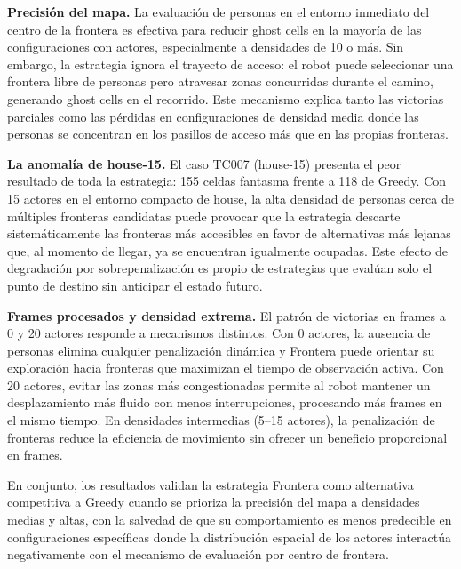 \textbf{Precisión del mapa.} La evaluación de personas en el entorno inmediato del centro de la frontera es efectiva para reducir ghost cells en la mayoría de las configuraciones con actores, especialmente a densidades de 10 o más. Sin embargo, la estrategia ignora el trayecto de acceso: el robot puede seleccionar una frontera libre de personas pero atravesar zonas concurridas durante el camino, generando ghost cells en el recorrido. Este mecanismo explica tanto las victorias parciales como las pérdidas en configuraciones de densidad media donde las personas se concentran en los pasillos de acceso más que en las propias fronteras.

\textbf{La anomalía de house-15.} El caso TC007 (house-15) presenta el peor resultado de toda la estrategia: 155 celdas fantasma frente a 118 de Greedy. Con 15 actores en el entorno compacto de house, la alta densidad de personas cerca de múltiples fronteras candidatas puede provocar que la estrategia descarte sistemáticamente las fronteras más accesibles en favor de alternativas más lejanas que, al momento de llegar, ya se encuentran igualmente ocupadas. Este efecto de degradación por sobrepenalización es propio de estrategias que evalúan solo el punto de destino sin anticipar el estado futuro.

\textbf{Frames procesados y densidad extrema.} El patrón de victorias en frames a 0 y 20 actores responde a mecanismos distintos. Con 0 actores, la ausencia de personas elimina cualquier penalización dinámica y Frontera puede orientar su exploración hacia fronteras que maximizan el tiempo de observación activa. Con 20 actores, evitar las zonas más congestionadas permite al robot mantener un desplazamiento más fluido con menos interrupciones, procesando más frames en el mismo tiempo. En densidades intermedias (5–15 actores), la penalización de fronteras reduce la eficiencia de movimiento sin ofrecer un beneficio proporcional en frames.

En conjunto, los resultados validan la estrategia Frontera como alternativa competitiva a Greedy cuando se prioriza la precisión del mapa a densidades medias y altas, con la salvedad de que su comportamiento es menos predecible en configuraciones específicas donde la distribución espacial de los actores interactúa negativamente con el mecanismo de evaluación por centro de frontera.
